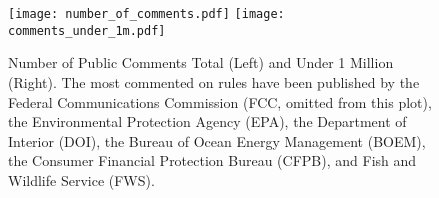 \begin{figure}[!hb]
\caption{Number of Public Comments Total (Left) and Under 1 Million (Right). The most commented on rules have been published by the Federal Communications Commission (FCC, omitted from this plot), the Environmental Protection Agency (EPA), the Department of Interior (DOI), the Bureau of Ocean Energy Management (BOEM), the Consumer Financial Protection Bureau (CFPB), and Fish and Wildlife Service (FWS).}
\texttt{[image: number\_of\_comments.pdf]}
\texttt{[image: comments\_under\_1m.pdf]}
\label{fig:comments}
\end{figure}






